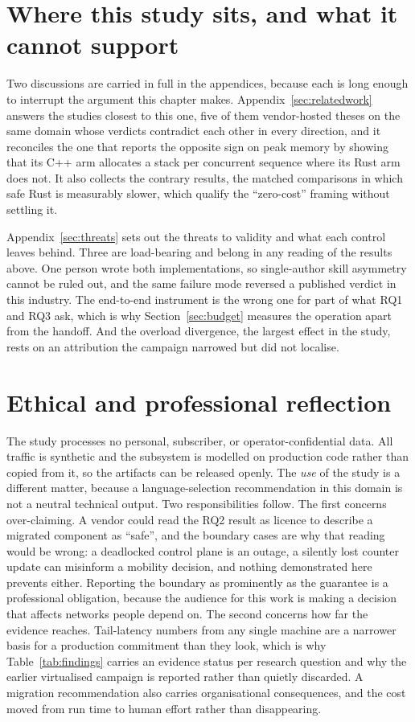 \documentclass[english,oneside,a4paper,censored,csm,software-track-2020]{HYthesisML}
\begin{document}
\section{Where this study sits, and what it cannot support}
Two discussions are carried in full in the appendices, because each is long enough to interrupt
the argument this chapter makes. Appendix~\ref{sec:relatedwork} answers the studies closest to
this one, five of them vendor-hosted theses on the same domain whose verdicts contradict each
other in every direction, and it reconciles the one that reports the opposite sign on peak memory
by showing that its C++ arm allocates a stack per concurrent sequence where its Rust arm does not.
It also collects the contrary results, the matched comparisons in which safe Rust is measurably
slower, which qualify the ``zero-cost'' framing without settling it.

Appendix~\ref{sec:threats} sets out the threats to validity and what each control leaves behind.
Three are load-bearing and belong in any reading of the results above. One person wrote both
implementations, so single-author skill asymmetry cannot be ruled out, and the same failure mode
reversed a published verdict in this industry. The end-to-end instrument is the wrong one for part
of what RQ1 and RQ3 ask, which is why Section~\ref{sec:budget} measures the operation apart from
the handoff. And the overload divergence, the largest effect in the study, rests on an attribution
the campaign narrowed but did not localise.

\section{Ethical and professional reflection}
The study processes no personal, subscriber, or operator-confidential data. All traffic is
synthetic and the subsystem is modelled on production code rather than copied from it, so the
artifacts can be released openly. The \emph{use} of the study is a different matter, because a
language-selection recommendation in this domain is not a neutral technical output. Two
responsibilities follow. The first concerns over-claiming. A vendor could read the RQ2 result as
licence to describe a migrated component as ``safe'', and the boundary cases are why that reading
would be wrong: a deadlocked control plane is an outage, a silently lost counter update can
misinform a mobility decision, and nothing demonstrated here prevents either. Reporting the
boundary as prominently as the guarantee is a professional obligation, because the audience for
this work is making a decision that affects networks people depend on. The second concerns how far
the evidence reaches. Tail-latency numbers from any single machine are a narrower basis for a
production commitment than they look, which is why Table~\ref{tab:findings} carries an evidence
status per research question and why the earlier virtualised campaign is reported rather than
quietly discarded. A migration recommendation also carries organisational consequences, and the
cost moved from run time to human effort rather than disappearing.
\end{document}
